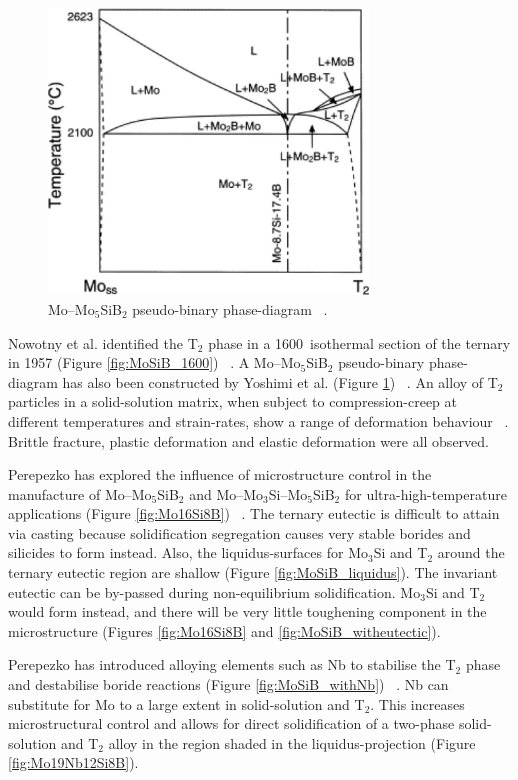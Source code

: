 %
%
\begin{figure}[H]
\begin{center}
\includegraphics[width=8.5cm]{Mo-Mo5SiB2}
\caption{Mo--Mo$_5$SiB$_2$ pseudo-binary phase-diagram ~\cite{yoshimi03}.}
\label{fig:Mo-Mo5SiB2}
\end{center}
\end{figure}
%
\clearpage
Nowotny et al. identified the T$_2$ phase in a 1600\celsius\ isothermal section of the ternary in 1957 (Figure \ref{fig:MoSiB_1600})  ~\cite{nowotny57}.  A Mo--Mo$_5$SiB$_2$ pseudo-binary phase-diagram has also been constructed by Yoshimi et al. (Figure \ref{fig:Mo-Mo5SiB2}) ~\cite{yoshimi03}.    An alloy of T$_2$ particles in a solid-solution matrix, when subject to compression-creep at different temperatures and strain-rates, show a range of deformation behaviour ~\cite{alur04}.  Brittle fracture, plastic deformation and elastic deformation were all observed.  

Perepezko has explored the influence of microstructure control in the manufacture of Mo--Mo$_5$SiB$_2$ and Mo--Mo$_3$Si--Mo$_5$SiB$_2$ for ultra-high-temperature applications (Figure \ref{fig:Mo16Si8B}) ~\cite{perepezko01}.  The ternary eutectic is difficult to attain via casting because solidification segregation causes very stable borides and silicides to form instead.  Also, the liquidus-surfaces for Mo$_3$Si and T$_2$ around the ternary eutectic region are shallow (Figure \ref{fig:MoSiB_liquidus}).  The invariant eutectic can be by-passed during non-equilibrium solidification.  Mo$_3$Si and T$_2$ would form instead, and there will be very little toughening component in the microstructure (Figures \ref{fig:Mo16Si8B} and \ref{fig:MoSiB_witheutectic}).

Perepezko has introduced alloying elements such as Nb to stabilise the T$_2$ phase and destabilise boride reactions (Figure \ref{fig:MoSiB_withNb}) ~\cite{perepezko01, sakidja00}.  Nb can substitute for Mo to a large extent in solid-solution and T$_2$.  This increases microstructural control and allows for direct solidification of a two-phase solid-solution and T$_2$ alloy in the region shaded in the liquidus-projection (Figure \ref{fig:Mo19Nb12Si8B}). 

